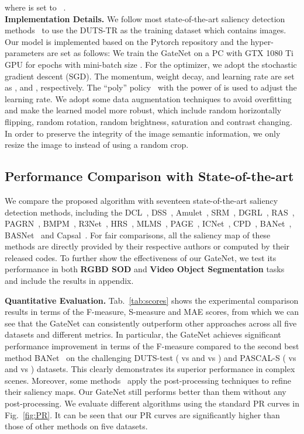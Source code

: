 \documentclass[runningheads]{llncs}
\begin{document}
	where  is set to ~\cite{S-m}.
	\\
	\textbf{Implementation Details.} 
	We follow most state-of-the-art saliency detection methods~\cite{BANet,BASNet,CTBIN,CPD,DGRL,PASE,HRS,PAGRN,BMPM} to use the DUTS-TR as the training dataset which contains  images. Our model is implemented based on the Pytorch repository and the hyper-parameters are set as follows: We train the GateNet on a PC with GTX 1080 Ti GPU for  epochs with mini-batch size . For the optimizer, we adopt the stochastic gradient descent (SGD). The momentum, weight decay, and learning rate are set as ,  and , respectively. The ``poly'' policy~\cite{poly} with the power of  is used to adjust the learning rate. 
	We adopt some data augmentation techniques to avoid overfitting and make the learned model more robust, which include random horizontally flipping, random rotation, random brightness, saturation and contrast changing. In order to preserve the integrity of the image semantic information, we only resize the image to   instead of using a random crop.
	\subsection{Performance Comparison with State-of-the-art}
	We compare the proposed algorithm with seventeen state-of-the-art saliency detection methods, including the DCL~\cite{DCL}, DSS~\cite{DSS}, Amulet~\cite{Amulet}, SRM~\cite{SRM}, DGRL~\cite{DGRL}, RAS~\cite{RAS}, PAGRN~\cite{PAGRN}, BMPM~\cite{BMPM}, R3Net~\cite{R3Net}, HRS~\cite{HRS}, MLMS~\cite{MLMS}, PAGE~\cite{PASE}, ICNet~\cite{CTBIN}, CPD~\cite{CPD}, BANet~\cite{BANet}, BASNet~\cite{BASNet} and Capsal~\cite{Capsal}. For fair comparisons, all the saliency map of these methods are directly provided by their respective authors or computed by their released codes. To further show the effectiveness of our GateNet, we test its performance in both \textbf{RGBD SOD} and \textbf{Video Object Segmentation} tasks and include the results in appendix.
	
	\textbf{Quantitative Evaluation.}
	Tab.~\ref{tab:scores} shows the experimental comparison results in terms of the F-measure, S-measure and MAE scores, from which we can see that the GateNet can consistently outperform other approaches across all five datasets and different metrics.  
In particular, the GateNet achieves significant performance improvement in terms of the F-measure compared to the second best method BANet~\cite{BANet} on the challenging DUTS-test ( vs  and  vs ) and PASCAL-S ( vs  and  vs ) datasets. This clearly demonstrates its superior performance in complex scenes.
Moreover, some methods~\cite{DCL,DSS,SRM,R3Net} apply the post-processing techniques to refine their saliency maps. Our GateNet still performs better than them without any post-processing.
We evaluate different algorithms using the standard PR curves in Fig.~\ref{fig:PR}. It can be seen that our PR curves are significantly higher than those of other methods on five datasets. 
	
\end{document}
